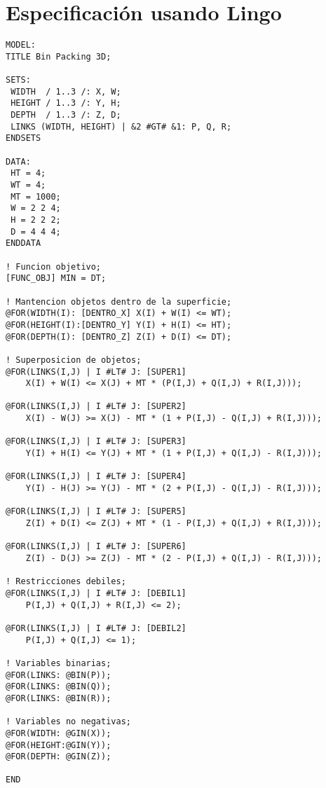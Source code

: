 \section{Especificación usando Lingo\label{sec:especificacion}}

\scriptsize
\begin{verbatim}
MODEL:
TITLE Bin Packing 3D;

SETS:
 WIDTH  / 1..3 /: X, W;
 HEIGHT / 1..3 /: Y, H;
 DEPTH  / 1..3 /: Z, D;
 LINKS (WIDTH, HEIGHT) | &2 #GT# &1: P, Q, R;
ENDSETS

DATA:
 HT = 4;
 WT = 4;
 MT = 1000;
 W = 2 2 4;
 H = 2 2 2;
 D = 4 4 4;
ENDDATA

! Funcion objetivo;
[FUNC_OBJ] MIN = DT;

! Mantencion objetos dentro de la superficie;
@FOR(WIDTH(I): [DENTRO_X] X(I) + W(I) <= WT);
@FOR(HEIGHT(I):[DENTRO_Y] Y(I) + H(I) <= HT);
@FOR(DEPTH(I): [DENTRO_Z] Z(I) + D(I) <= DT);

! Superposicion de objetos;
@FOR(LINKS(I,J) | I #LT# J: [SUPER1]
    X(I) + W(I) <= X(J) + MT * (P(I,J) + Q(I,J) + R(I,J)));

@FOR(LINKS(I,J) | I #LT# J: [SUPER2]
    X(I) - W(J) >= X(J) - MT * (1 + P(I,J) - Q(I,J) + R(I,J)));

@FOR(LINKS(I,J) | I #LT# J: [SUPER3]
    Y(I) + H(I) <= Y(J) + MT * (1 + P(I,J) + Q(I,J) - R(I,J)));

@FOR(LINKS(I,J) | I #LT# J: [SUPER4]
    Y(I) - H(J) >= Y(J) - MT * (2 + P(I,J) - Q(I,J) - R(I,J)));

@FOR(LINKS(I,J) | I #LT# J: [SUPER5]
    Z(I) + D(I) <= Z(J) + MT * (1 - P(I,J) + Q(I,J) + R(I,J)));

@FOR(LINKS(I,J) | I #LT# J: [SUPER6]
    Z(I) - D(J) >= Z(J) - MT * (2 - P(I,J) + Q(I,J) - R(I,J)));

! Restricciones debiles;
@FOR(LINKS(I,J) | I #LT# J: [DEBIL1]
    P(I,J) + Q(I,J) + R(I,J) <= 2);

@FOR(LINKS(I,J) | I #LT# J: [DEBIL2]
    P(I,J) + Q(I,J) <= 1);

! Variables binarias;
@FOR(LINKS: @BIN(P));
@FOR(LINKS: @BIN(Q));
@FOR(LINKS: @BIN(R));

! Variables no negativas;
@FOR(WIDTH: @GIN(X));
@FOR(HEIGHT:@GIN(Y));
@FOR(DEPTH: @GIN(Z));

END
\end{verbatim}
\normalsize
